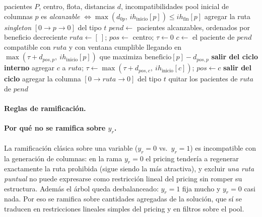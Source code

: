 \documentclass[12pt]{article}
\numberwithin{algorithm}{section}
\begin{document}
\begin{algorithm}[H]
\caption{\textsc{ColumnasIniciales} --- singletons factibles $+$ heurística golosa}
\label{alg:init}
\begin{algorithmic}[1]
\Require pacientes $P$, centro, flota, distancias $d$, incompatibilidades
\Ensure pool inicial de columnas
\State $p$ es \emph{alcanzable} $\iff \max(d_{0p},\, ih_{\text{inicio}}[p]) \leq ih_{\text{fin}}[p]$ 
    \State agregar la ruta \emph{singleton} $[0 \to p \to 0]$ del tipo $t$
\EndFor
{} 
    \State $\mathit{pend} \gets$ pacientes alcanzables, ordenados por beneficio decreciente
        \State $\mathit{ruta} \gets [\ ]$; $\mathit{pos} \gets$ centro; $\tau \gets 0$
            \State $c \gets$ el paciente de $\mathit{pend}$ compatible con $\mathit{ruta}$ y con ventana cumplible llegando en $\max(\tau + d_{\mathit{pos},p},\ ih_{\text{inicio}}[p])$ que maximiza $\text{beneficio}[p] - d_{\mathit{pos},p}$
             \textbf{salir del ciclo interno}
            \EndIf
            \State agregar $c$ a $\mathit{ruta}$; $\tau \gets \max(\tau + d_{\mathit{pos},c},\ ih_{\text{inicio}}[c])$; $\mathit{pos} \gets c$
        \EndWhile
         \textbf{salir del ciclo} 
        \EndIf
         agregar la columna $[0 \to \mathit{ruta} \to 0]$ del tipo $t$ 
        \EndIf
        \State quitar los pacientes de $\mathit{ruta}$ de $\mathit{pend}$
    \EndWhile
\EndFor
\end{algorithmic}
\end{algorithm}


\paragraph{Reglas de ramificación.}

\paragraph{Por qué no se ramifica sobre $y_r$.} La ramificación clásica sobre una variable ($y_r = 0$ vs.\ $y_r = 1$) es incompatible con la generación de columnas: en la rama $y_r = 0$ el pricing tendería a regenerar exactamente la ruta prohibida (sigue siendo la más atractiva), y excluir \emph{una ruta puntual} no puede expresarse como restricción lineal del pricing sin romper su estructura. Además el árbol queda desbalanceado: $y_r = 1$ fija mucho y $y_r = 0$ casi nada. Por eso se ramifica sobre cantidades agregadas de la solución, que sí se traducen en restricciones lineales simples del pricing y en filtros sobre el pool.
\end{document}
